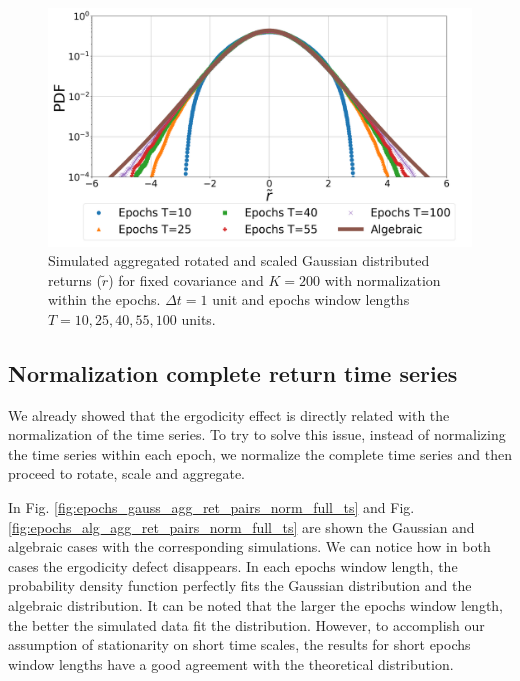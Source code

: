 \begin{figure}[htbp]
    \centering
    \includegraphics[width=0.6\columnwidth]
    {figures/06_epochs_sim_alg_agg_ret_pairs_norm.png}
    \caption{Simulated aggregated rotated and scaled Gaussian distributed
             returns ($\tilde{r}$) for fixed covariance and $K=200$ with
             normalization within the epochs. $\Delta t = 1$ unit and epochs
             window lengths $T=10, 25, 40, 55, 100$ units.}
    \label{fig:epochs_alg_agg_ret_pairs_norm}
\end{figure}

\subsection{Normalization complete return time series}
\label{subsec:norm_full_sim}

We already showed that the ergodicity effect is directly related with the
normalization of the time series. To try to solve this issue, instead of
normalizing the time series within each epoch, we normalize the complete time
series and then proceed to rotate, scale and aggregate.

In Fig. \ref{fig:epochs_gauss_agg_ret_pairs_norm_full_ts} and Fig.
\ref{fig:epochs_alg_agg_ret_pairs_norm_full_ts} are shown the Gaussian and
algebraic cases with the corresponding simulations. We can notice how in both
cases the ergodicity defect disappears. In each epochs window length, the
probability density function perfectly fits the Gaussian distribution and the
algebraic distribution. It can be noted that the larger the epochs window
length, the better the simulated data fit the distribution. However, to
accomplish our assumption of stationarity on short time scales, the results
for short epochs window lengths have a good agreement with the theoretical
distribution.

